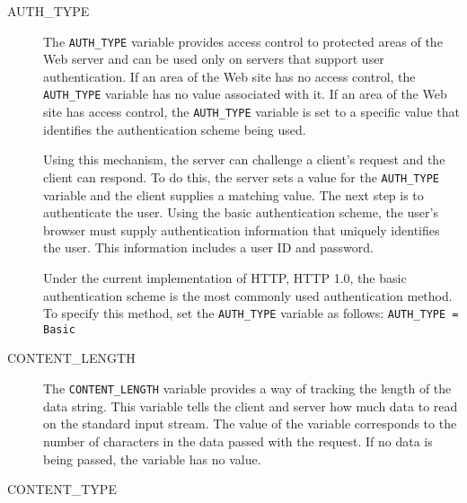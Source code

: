 \begin{description}

\item[AUTH\_TYPE]

The \verb|AUTH_TYPE| variable provides access control to protected areas of
the Web server and can be used only on servers that support user
authentication. If an area of the Web site has no access control, the
\verb|AUTH_TYPE| variable has no value associated with it. If an area of the
Web site has access control, the \verb|AUTH_TYPE| variable is set to a specific
value that identifies the authentication scheme being used. 

Using this mechanism, the server can challenge a client's request and the
client can respond. To do this, the server sets a value for the
\verb|AUTH_TYPE| variable and the client supplies a matching value. The next
step is to authenticate the user. Using the basic authentication scheme, the
user's browser must supply authentication information that uniquely
identifies the user. This information includes a user ID and password.

Under the current implementation of HTTP, HTTP 1.0, the basic authentication
scheme is the most commonly used authentication method. To specify this method,
set the \verb|AUTH_TYPE| variable as follows: \verb|AUTH_TYPE = Basic|

\item[CONTENT\_LENGTH]

The \verb|CONTENT_LENGTH| variable provides a way of tracking the length of the
data string. This variable tells the client and server how much data to read on
the standard input stream. The value of the variable corresponds to the number
of characters in the data passed with the request. If no data is being passed,
the variable has no value.


\item[CONTENT\_TYPE]


\end{description}
